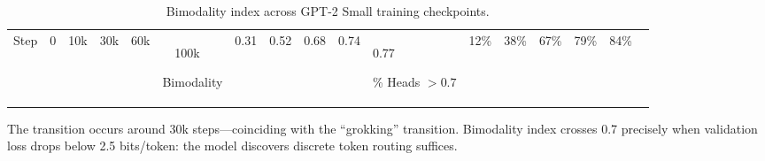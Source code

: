 \begin{table}[h]





\centering





\caption{Bimodality index across GPT-2 Small training checkpoints.}





\label{tab:training-bimodal}





\begin{tabular}{lccccc}





\toprule





Step & 0 & 10k & 30k & 60k & 100k \





\midrule





Bimodality & 0.31 & 0.52 & 0.68 & 0.74 & 0.77 \





\% Heads $> 0.7$ & 12\% & 38\% & 67\% & 79\% & 84\% \





\bottomrule





\end{tabular}





\end{table}











The transition occurs around 30k steps---coinciding with the ``grokking'' transition. Bimodality index crosses 0.7 precisely when validation loss drops below 2.5 bits/token: the model discovers discrete token routing suffices.












